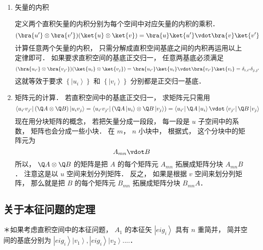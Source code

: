 \begin{enumerate}
\item 矢量的内积

定义两个直积矢量的内积分别为每个空间中对应矢量的内积的乘积．
\begin{equation}
(\bra{u'}\otimes\bra{v'})(\ket{u}\otimes\ket{v}) = \bra{u}\ket{u'}\vdot\bra{v}\ket{v'}
\end{equation}
计算任意两个矢量的内积， 只需分解成直积空间基底之间的内积再运用以上定律即可． 如果要求直积空间的基底正交归一， 任意两基底必须满足
\begin{equation}
(\bra{u_{i'}} \otimes \bra{v_{j'}})(\ket{u_i} \otimes \ket{v_j}) = \bra{u_{i'}}\ket{u_i} \vdot \bra{v_{i'}}\ket{v_i} = \delta_{i,i'}\delta_{j,j'}
\end{equation}
这就等效于要求 $\left\{ {\left| {{u_i}} \right\rangle } \right\}$ 和 $\left\{ {\left| {{v_i}} \right\rangle } \right\}$  分别都是正交归一基底．

\item 矩阵元的计算． 若直积空间中的基底正交归一， 求矩阵元只需用
 \begin{equation}
 \left\langle {{u_{i'}}{v_{j'}}} \right|\left( {\Q A \otimes \Q B} \right)\left| {{u_i}{v_j}} \right\rangle  = \left\langle {{u_{i'}}{v_{j'}}} \right|\left( {\Q A\left| {{u_i}} \right\rangle  \otimes \Q B\left| {{v_j}} \right\rangle } \right) = \left\langle {{u_{i'}}} \right|\Q A\left| {{u_i}} \right\rangle  \vdot \left\langle {{v_{j'}}} \right|\Q B\left| {{v_j}} \right\rangle 
\end{equation}
现在用分块矩阵的概念， 若把矢量分成一段段， 每一段是 $u$ 子空间中的系数， 矩阵也会分成一些小块． 在 $m$，  $n$ 小块中， 根据式， 这个分块中的矩阵元为
 \begin{equation}
  {A_{mn}} \vdot B
\end{equation}
所以，  $\Q A \otimes \Q B$ 的矩阵是把 $A$ 的每个矩阵元 ${A_{mn}}$ 拓展成矩阵分块 ${A_{mn}}B$．  注意这是以 $u$ 空间来划分列矩阵． 反之， 如果是根据 $v$ 空间来划分列矩阵， 那么就是把 $B$ 的每个矩阵元 ${B_{mn}}$ 拓展成矩阵分块 ${B_{mn}}A$． 
\end{enumerate}

\subsection{关于本征问题的定理}%
	
＊如果考虑直积空间中的本征问题， ${A_1}$  的本征矢 $\left| {ei{g_i}} \right\rangle $ 具有 $n$ 重简并， 简并空间的基底分别为 $\left| {ei{g_i}} \right\rangle \left| {{v_1}} \right\rangle ,\left| {ei{g_i}} \right\rangle \left| {{v_2}} \right\rangle ....$． 

